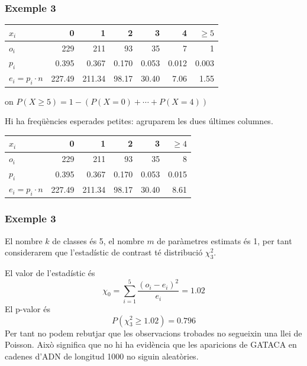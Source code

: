\documentclass[12pt,t]{beamer}
\renewcommand{\geq}{\geqslant}
\theoremstyle{plain}
\theoremstyle{definition}
\begin{document}
\begin{frame}
\frametitle{Exemple 3}
\vspace*{-2ex}

\begin{center}
\small \begin{tabular}{|l|rrrrrr|}
\hline
$x_i$ & 0 & 1 & 2 & 3 & 4 & $\geq 5$ \\
\hline
$o_{i}$& 229 & 211 & 93 & 35 & 7 & 1 \\
\hline
$p_i$ &0.395 &  0.367  &0.170 & 0.053 & 0.012 & 0.003 \\ \hline
$e_i=p_i\cdot n$ &  227.49 & 211.34 & 98.17 & 30.40  & 7.06 &  1.55\\ \hline
\end{tabular}
\end{center}
on $P(X\geq 5)=1-(P(X=0)+\cdots +P(X=4))$
\medskip

Hi ha freqüències esperades petites: agruparem les dues últimes columnes. \pause
\medskip

\begin{center}
\small \begin{tabular}{|l|rrrrr|}
\hline
$x_i$ & 0 & 1 & 2 & 3 & $\geq 4$ \\
\hline
$o_{i}$& 229 & 211 & 93 & 35 & 8 \\
\hline
$p_i$ &0.395 &  0.367  &0.170 & 0.053 & 0.015 \\ \hline
$e_i=p_i\cdot n$ &  227.49 & 211.34 & 98.17 & 30.40  & 8.61\\ \hline
\end{tabular}
\end{center}



\end{frame}


\begin{frame}
\frametitle{Exemple 3}
El nombre $k$ de classes és 5, el nombre $m$ de paràmetres estimats és 1, per tant considerarem que l'estadístic de contrast té distribució $\chi^2_{3}$.
\medskip

El valor de l'estadístic és
$$
\chi_0=\sum_{i=1}^5\frac{(o_i-e_i)^2}{e_i}=1.02
$$
El p-valor és
$$
P(\chi_3^2\geq 1.02)=0.796
$$
Per tant no podem rebutjar que les observacions trobades no segueixin una llei de Poisson. Això significa que no hi ha evidència que les aparicions de GATACA en cadenes d'ADN de longitud 1000 no siguin aleatòries.
\end{frame}
\end{document}
